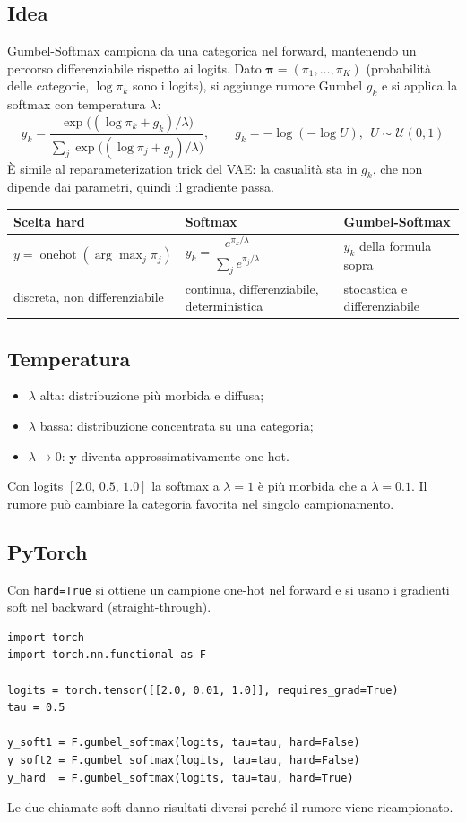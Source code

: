 \documentclass[11pt,a4paper]{article}
\begin{document}
\subsection{Idea}
Gumbel-Softmax campiona da una categorica nel forward, mantenendo un percorso differenziabile rispetto ai logits.
Dato $\boldsymbol{\pi}=(\pi_1,\dots,\pi_K)$ (probabilità delle categorie, $\log\pi_k$ sono i logits), si aggiunge rumore Gumbel $g_k$ e si applica la softmax con temperatura $\lambda$:
\[
\boxed{y_k=\frac{\exp\big((\log\pi_k+g_k)/\lambda\big)}{\sum_{j}\exp\big((\log\pi_j+g_j)/\lambda\big)},\qquad g_k=-\log(-\log U),\ \ U\sim\mathcal{U}(0,1)}
\]
È simile al reparameterization trick del VAE: la casualità sta in $g_k$, che non dipende dai parametri, quindi il gradiente passa.

\begin{center}
\renewcommand{\arraystretch}{1.35}
\begin{tabular}{|p{3.3cm}|p{5.2cm}|p{5.2cm}|}
\hline
\textbf{Scelta hard} & \textbf{Softmax} & \textbf{Gumbel-Softmax} \\
\hline
$y=\operatorname{onehot}(\arg\max_j\pi_j)$ & $y_k=\dfrac{e^{\pi_k/\lambda}}{\sum_j e^{\pi_j/\lambda}}$ & $y_k$ della formula sopra \\
\hline
discreta, non differenziabile & continua, differenziabile, deterministica & stocastica e differenziabile \\
\hline
\end{tabular}
\end{center}

\subsection{Temperatura}
\begin{itemize}
  \item $\lambda$ alta: distribuzione più morbida e diffusa;
  \item $\lambda$ bassa: distribuzione concentrata su una categoria;
  \item $\lambda\to0$: $\mathbf{y}$ diventa approssimativamente one-hot.
\end{itemize}
Con logits $[2.0,\,0.5,\,1.0]$ la softmax a $\lambda=1$ è più morbida che a $\lambda=0.1$.
Il rumore può cambiare la categoria favorita nel singolo campionamento.

\subsection{PyTorch}
Con \texttt{hard=True} si ottiene un campione one-hot nel forward e si usano i gradienti soft nel backward (straight-through).
\begin{lstlisting}
import torch
import torch.nn.functional as F

logits = torch.tensor([[2.0, 0.01, 1.0]], requires_grad=True)
tau = 0.5

y_soft1 = F.gumbel_softmax(logits, tau=tau, hard=False)
y_soft2 = F.gumbel_softmax(logits, tau=tau, hard=False)
y_hard  = F.gumbel_softmax(logits, tau=tau, hard=True)
\end{lstlisting}
Le due chiamate soft danno risultati diversi perché il rumore viene ricampionato.
\end{document}

